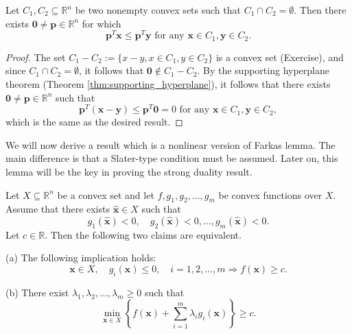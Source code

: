 \documentclass[10pt,a4paper]{article}
\begin{document}
\begin{theorem}\label{thm:separation_sets}
	Let $C_1, C_2 \subseteq \mathbb{R}^n$ be two nonempty convex sets such that $C_1 \cap C_2 = \emptyset$. Then there exists $\mathbf{0} \neq \mathbf{p} \in \mathbb{R}^n$ for which
	\begin{equation*}
		\mathbf{p}^T \mathbf{x} \leq \mathbf{p}^T \mathbf{y} \text{ for any } \mathbf{x} \in C_1, \mathbf{y} \in C_2.
	\end{equation*}
\end{theorem}

\begin{proof}
	The set $C_1 - C_2:=\{x-y, x\in C_1, y\in C_2\}$ is a convex set (Exercise), and since $C_1 \cap C_2 = \emptyset$,
	it follows that $\mathbf{0} \notin C_1 - C_2$. By the supporting hyperplane theorem (Theorem \ref{thm:supporting_hyperplane}), it
	follows that there exists $\mathbf{0} \neq \mathbf{p} \in \mathbb{R}^n$ such that
	\begin{equation*}
		\mathbf{p}^T(\mathbf{x} - \mathbf{y}) \leq \mathbf{p}^T \mathbf{0} = 0 \text{ for any } \mathbf{x} \in C_1, \mathbf{y} \in C_2,
	\end{equation*}
	which is the same as the desired result.
\end{proof}

\noindent We will now derive a result which is a nonlinear version of Farkas lemma. The main difference is that a Slater-type condition must be assumed. Later on, this lemma will be
the key in proving the strong duality result.

\begin{theorem}\label{thm:nonlinear_farkas}
	Let $X \subseteq \mathbb{R}^n$ be a convex set and let $f, g_1, g_2, \ldots, g_m$ be convex functions over $X$. Assume that there exists $\hat{\mathbf{x}} \in X$ such that
	\begin{equation*}
		g_1(\hat{\mathbf{x}}) < 0, \quad g_2(\hat{\mathbf{x}}) < 0, \ldots, g_m(\hat{\mathbf{x}}) < 0.
	\end{equation*}
	Let $c \in \mathbb{R}$. Then the following two claims are equivalent.
	
	(a) The following implication holds:
	\begin{equation*}
		\mathbf{x} \in X, \quad g_i(\mathbf{x}) \leq 0, \quad i = 1, 2, \ldots, m \Rightarrow f(\mathbf{x}) \geq c.
	\end{equation*}
	
	(b) There exist $\lambda_1, \lambda_2, \ldots, \lambda_m \geq 0$ such that
	\begin{equation}\label{eq:farkas_b}
		\min_{\mathbf{x} \in X} \left\{ f(\mathbf{x}) + \sum_{i=1}^{m} \lambda_i g_i(\mathbf{x}) \right\} \geq c.
	\end{equation}
\end{theorem}
\end{document}
